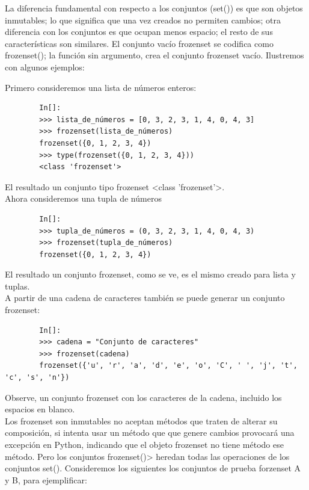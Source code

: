 	La diferencia fundamental con respecto a los conjuntos ({\ttfamily set()}) es que son objetos inmutables; lo que significa que una vez creados no permiten cambios;  otra diferencia con los conjuntos es que ocupan menos espacio;  el resto de sus características son similares. El conjunto vacío  {\ttfamily frozenset} se codifica como {\ttfamily frozenset()};  la función sin argumento, crea el conjunto  {\ttfamily frozenset}  vacío. Ilustremos con algunos ejemplos:
	
	Primero consideremos una lista de números enteros:
	\begin{lstlisting}	
		In[]:	
		>>> lista_de_números = [0, 3, 2, 3, 1, 4, 0, 4, 3]		
		>>> frozenset(lista_de_números)
		frozenset({0, 1, 2, 3, 4})
		>>> type(frozenset({0, 1, 2, 3, 4}))
		<class 'frozenset'>
	\end{lstlisting}	
	El resultado un conjunto tipo {\ttfamily frozenset <class {}'{}frozenset{}'{}>{}}.\\
	
	
	Ahora consideremos una tupla de números 
	\begin{lstlisting}		
		In[]:
		>>> tupla_de_números = (0, 3, 2, 3, 1, 4, 0, 4, 3)	
		>>> frozenset(tupla_de_números)
		frozenset({0, 1, 2, 3, 4})
	\end{lstlisting}	
	
	El resultado un conjunto  {\ttfamily frozenset}, como se ve, es el mismo creado para lista y tuplas. \\
	
	
	
	
	A partir de una cadena de caracteres también se puede generar un conjunto frozenset:
	\begin{lstlisting}	
		In[]:	
		>>> cadena = "Conjunto de caracteres"	
		>>> frozenset(cadena)
		frozenset({'u', 'r', 'a', 'd', 'e', 'o', 'C', ' ', 'j', 't', 'c', 's', 'n'})
	\end{lstlisting}	
	
	\noindent Observe, un conjunto frozenset con los caracteres de la cadena, incluido los espacios en blanco.\\
	
	Los frozenset son inmutables no aceptan métodos que traten de alterar su composición, si intenta usar un método que que genere cambios  provocará una excepción en Python, indicando que  el objeto frozenset no tiene método ese método. Pero los conjuntos {\ttfamily frozenset()}>  heredan todas las operaciones de los  conjuntos {\ttfamily set()}.  Consideremos los siguientes los conjuntos  de prueba forzenset {\ttfamily A} y {\ttfamily B}, para ejemplificar:
	
